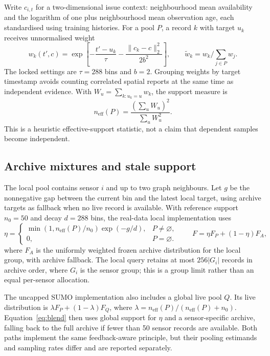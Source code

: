 Write $c_{i,t}$ for a two-dimensional issue context: neighbourhood mean availability and the logarithm of one plus neighbourhood mean observation age, each standardised using training histories. For a pool $P$, a record $k$ with target $u_k$ receives unnormalised weight
\begin{equation}
w_k(t',c)=\exp\left[-\frac{t'-u_k}{\tau}-\frac{\|c_k-c\|_2^2}{2b^2}\right],\qquad
\widetilde w_k=w_k/\sum_{j\in P}w_j.
\label{eq:weights}
\end{equation}
The locked settings are $\tau=288$ bins and $b=2$. Grouping weights by target timestamp avoids counting correlated spatial reports at the same time as independent evidence. With $W_u=\sum_{k:u_k=u}w_k$, the support measure is
\begin{equation}
n_{\mathrm{eff}}(P)=\frac{(\sum_u W_u)^2}{\sum_u W_u^2}.
\label{eq:ess}
\end{equation}
This is a heuristic effective-support statistic, not a claim that dependent samples become independent.

\subsection{Archive mixtures and stale support}
The local pool contains sensor $i$ and up to two graph neighbours. Let $g$ be the nonnegative gap between the current bin and the latest local target, using archive targets as fallback when no live record is available. With reference support $n_0=50$ and decay $d=288$ bins, the real-data local implementation uses
\begin{equation}
\eta=\begin{cases}\min(1,n_{\mathrm{eff}}(P)/n_0)\exp(-g/d),&P\ne\varnothing,\\0,&P=\varnothing.\end{cases}
\qquad F=\eta F_P+(1-\eta)F_A,
\label{eq:blend}
\end{equation}
where $F_A$ is the uniformly weighted frozen archive distribution for the local group, with archive fallback. The local query retains at most $256|G_i|$ records in archive order, where $G_i$ is the sensor group; this is a group limit rather than an equal per-sensor allocation.

The uncapped SUMO implementation also includes a global live pool $Q$. Its live distribution is $\lambda F_P+(1-\lambda)F_Q$, where $\lambda=n_{\mathrm{eff}}(P)/(n_{\mathrm{eff}}(P)+n_0)$. Equation~\eqref{eq:blend} then uses global support for $\eta$ and a sensor-specific archive, falling back to the full archive if fewer than 50 sensor records are available. Both paths implement the same feedback-aware principle, but their pooling estimands and sampling rates differ and are reported separately.

